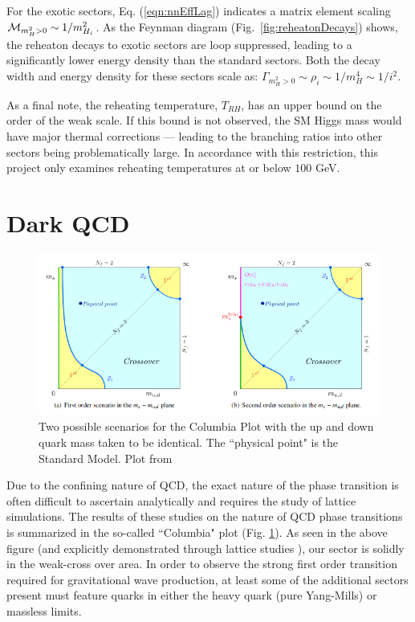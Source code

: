 \documentclass[nofootinbib,twocolumn,preprintnumbers]{revtex4-1}
\begin{document}
For the exotic sectors, Eq. (\ref{eqn:nnEffLag}) indicates a matrix element scaling ${\cal M}_{m_H^2>0} \sim 1/m_{H_i}^2$. As the Feynman diagram (Fig.~\ref{fig:reheatonDecays}) shows, the reheaton decays to exotic sectors are loop suppressed, leading to a significantly lower energy density than the standard sectors. Both the decay width and energy density for these sectors scale as: $\Gamma_{m_H^2>0} \sim \rho_i \sim 1/m_H^4 \sim 1/i^2$. 

As a final note, the reheating temperature, $T_{RH}$,  has an upper bound on the order of the weak scale. If this bound is not observed, the SM Higgs mass would have major thermal corrections --- leading to the branching ratios into other sectors being problematically large. In accordance with this restriction, this project only examines reheating temperatures at or below $100$ GeV.


\section{Dark QCD}
\label{sec:dQCD}

\begin{figure}[tb]
\centering
\begin{minipage}[c]{\textwidth}
\includegraphics[width=1.0\textwidth]{columbia.png}
\end{minipage}
\hfill
\caption{Two possible scenarios for the Columbia Plot with the up and down quark mass taken to be identical. The ``physical point" is the Standard Model. Plot from \cite{Cuteri:2017zcb}
}
\label{fig:columbia}
\end{figure}

Due to the confining nature of QCD, the exact nature of the phase transition is often difficult to ascertain analytically and requires the study of lattice simulations. The results of these studies on the nature of QCD phase transitions is summarized in the so-called ``Columbia" plot (Fig. \ref{fig:columbia}). As seen in the above figure (and explicitly demonstrated through lattice studies \cite{lattice}), our sector is solidly in the weak-cross over area. In order to observe the strong first order transition required for gravitational wave production, at least some of the additional sectors present must feature quarks in either the heavy quark (pure Yang-Mills) or massless limits.    
\end{document}
